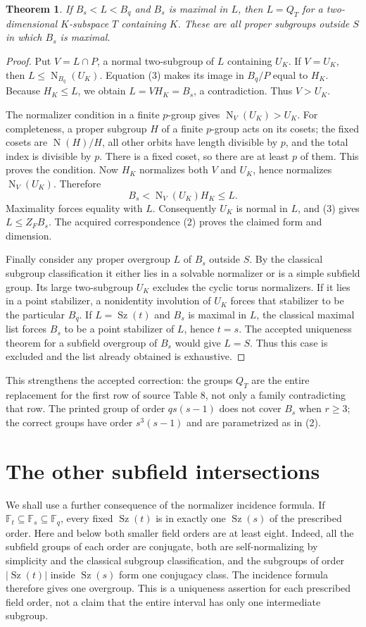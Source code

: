 \documentclass[11pt,a4paper]{article}
\newtheorem{theorem}{Theorem}
\newcommand{\F}{\mathbb F}
\newcommand{\Sz}{\operatorname{Sz}}
\newcommand{\N}{\operatorname{N}}
\begin{document}
\begin{theorem}\label{covers}
If $B_s<L<B_q$ and $B_s$ is maximal in $L$, then $L=Q_T$ for
a two-dimensional $K$-subspace $T$ containing $K$. These are all
proper subgroups outside $S$ in which $B_s$ is maximal.
\end{theorem}
\begin{proof}
Put $V=L\cap P$, a normal two-subgroup of $L$ containing $U_K$.
If $V=U_K$, then $L\le\N_{B_q}(U_K)$. Equation (3) makes its
image in $B_q/P$ equal to $H_K$. Because $H_K\le L$, we obtain
$L=VH_K=B_s$, a contradiction. Thus $V>U_K$.

The normalizer condition in a finite $p$-group gives
$\N_V(U_K)>U_K$. For completeness, a proper subgroup $H$ of
a finite $p$-group acts on its cosets; the fixed cosets are
$\N(H)/H$, all other orbits have length divisible by $p$, and
the total index is divisible by $p$. There is a fixed coset, so
there are at least $p$ of them. This proves the condition.
Now $H_K$ normalizes both $V$ and $U_K$, hence normalizes
$\N_V(U_K)$. Therefore
\[
             B_s<\N_V(U_K)H_K\le L.
\]
Maximality forces equality with $L$. Consequently $U_K$ is
normal in $L$, and (3) gives $L\le Z_FB_s$. The acquired
correspondence (2) proves the claimed form and dimension.

Finally consider any proper overgroup $L$ of $B_s$ outside $S$.
By the classical subgroup classification it either lies in a
solvable normalizer or is a simple subfield group. Its large
two-subgroup $U_K$ excludes the cyclic torus normalizers.
If it lies in a point stabilizer, a nonidentity involution of
$U_K$ forces that stabilizer to be the particular $B_q$.
If $L=\Sz(t)$ and $B_s$ is maximal in $L$, the classical maximal
list forces $B_s$ to be a point stabilizer of $L$, hence $t=s$.
The accepted uniqueness theorem for a subfield overgroup of
$B_s$ would give $L=S$. Thus this case is excluded and the
list already obtained is exhaustive.
\end{proof}

This strengthens the accepted correction: the groups $Q_T$ are
the entire replacement for the first row of source Table 8, not
only a family contradicting that row. The printed group of order
$qs(s-1)$ does not cover $B_s$ when $r\ge3$; the correct groups
have order $s^3(s-1)$ and are parametrized as in (2).

\section{The other subfield intersections}
We shall use a further consequence of the normalizer incidence
formula. If $\F_t\subseteq\F_s\subseteq\F_q$, every fixed
$\Sz(t)$ is in exactly one $\Sz(s)$ of the
prescribed order. Here and below both smaller field orders are at
least eight. Indeed, all the subfield groups of each order are
conjugate, both are self-normalizing by simplicity and the classical
subgroup classification, and the subgroups of order $|\Sz(t)|$
inside $\Sz(s)$ form one conjugacy class. The incidence formula
therefore gives one overgroup. This is a uniqueness assertion for
each prescribed field order, not a claim that the entire interval
has only one intermediate subgroup.
\end{document}
